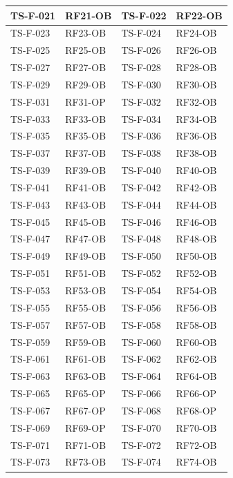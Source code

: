 \documentclass[a4paper,12pt]{article}
\begin{document}
{\begin{longtable}{|p{2.5cm}|p{2.2cm}|p{2.5cm}|p{2.2cm}|}
    \hline
    TS-F-021 & RF21-OB & TS-F-022 & RF22-OB \\
    \hline
    TS-F-023 & RF23-OB & TS-F-024 & RF24-OB \\
    \hline
    TS-F-025 & RF25-OB & TS-F-026 & RF26-OB \\
    \hline
    TS-F-027 & RF27-OB & TS-F-028 & RF28-OB \\
    \hline
    TS-F-029 & RF29-OB & TS-F-030 & RF30-OB \\
    \hline
    TS-F-031 & RF31-OP & TS-F-032 & RF32-OB \\
    \hline
    TS-F-033 & RF33-OB & TS-F-034 & RF34-OB \\
    \hline
    TS-F-035 & RF35-OB & TS-F-036 & RF36-OB \\
    \hline
    TS-F-037 & RF37-OB & TS-F-038 & RF38-OB \\
    \hline
    TS-F-039 & RF39-OB & TS-F-040 & RF40-OB \\
    \hline
    TS-F-041 & RF41-OB & TS-F-042 & RF42-OB \\
    \hline
    TS-F-043 & RF43-OB & TS-F-044 & RF44-OB \\
    \hline
    TS-F-045 & RF45-OB & TS-F-046 & RF46-OB \\
    \hline
    TS-F-047 & RF47-OB & TS-F-048 & RF48-OB \\
    \hline
    TS-F-049 & RF49-OB & TS-F-050 & RF50-OB \\
    \hline
    TS-F-051 & RF51-OB & TS-F-052 & RF52-OB \\
    \hline
    TS-F-053 & RF53-OB & TS-F-054 & RF54-OB \\
    \hline
    TS-F-055 & RF55-OB & TS-F-056 & RF56-OB \\
    \hline
    TS-F-057 & RF57-OB & TS-F-058 & RF58-OB \\
    \hline
    TS-F-059 & RF59-OB & TS-F-060 & RF60-OB \\
    \hline
    TS-F-061 & RF61-OB & TS-F-062 & RF62-OB \\
    \hline
    TS-F-063 & RF63-OB & TS-F-064 & RF64-OB \\
    \hline
    TS-F-065 & RF65-OP & TS-F-066 & RF66-OP \\
    \hline
    TS-F-067 & RF67-OP & TS-F-068 & RF68-OP \\
    \hline
    TS-F-069 & RF69-OP & TS-F-070 & RF70-OB \\
    \hline
    TS-F-071 & RF71-OB & TS-F-072 & RF72-OB \\
    \hline
    TS-F-073 & RF73-OB & TS-F-074 & RF74-OB \\

\end{longtable}}
\end{document}
